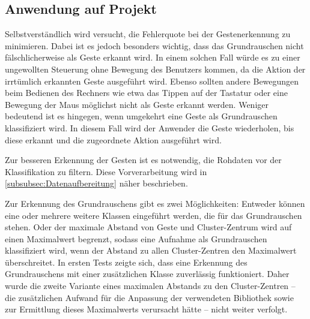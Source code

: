 \subsection{Anwendung auf Projekt}
Selbstverständlich wird versucht, die Fehlerquote bei der Gestenerkennung zu minimieren. Dabei ist es jedoch besonders wichtig, dass das Grundrauschen nicht fälschlicherweise als Geste erkannt wird. In einem solchen Fall würde es zu einer ungewollten Steuerung ohne Bewegung des Benutzers kommen, da die Aktion der irrtümlich erkannten Geste ausgeführt wird. Ebenso sollten andere Bewegungen beim Bedienen des Rechners wie etwa das Tippen auf der Tastatur oder eine Bewegung der Maus möglichst nicht als Geste erkannt werden.
Weniger bedeutend ist es hingegen, wenn umgekehrt eine Geste als Grundrauschen klassifiziert wird. In diesem Fall wird der Anwender die Geste wiederholen, bis diese erkannt und die zugeordnete Aktion ausgeführt wird.

Zur besseren Erkennung der Gesten ist es notwendig, die Rohdaten vor der Klassifikation zu filtern. Diese Vorverarbeitung wird in \autoref{subsubsec:Datenaufbereitung} näher beschrieben.

Zur Erkennung des Grundrauschens gibt es zwei Möglichkeiten: Entweder können eine oder mehrere weitere Klassen eingeführt werden, die für das Grundrauschen stehen. Oder der maximale Abstand von Geste und Cluster-Zentrum wird auf einen Maximalwert begrenzt, sodass
eine Aufnahme als Grundrauschen klassifiziert wird, wenn der Abstand zu allen Cluster-Zentren den Maximalwert überschreitet.
In ersten Tests zeigte sich, dass eine Erkennung des Grundrauschens mit einer zusätzlichen Klasse zuverlässig funktioniert. Daher wurde die zweite Variante eines maximalen Abstands zu den Cluster-Zentren -- die zusätzlichen Aufwand für die Anpassung der verwendeten Bibliothek sowie zur Ermittlung dieses Maximalwerts verursacht hätte -- nicht weiter verfolgt.


